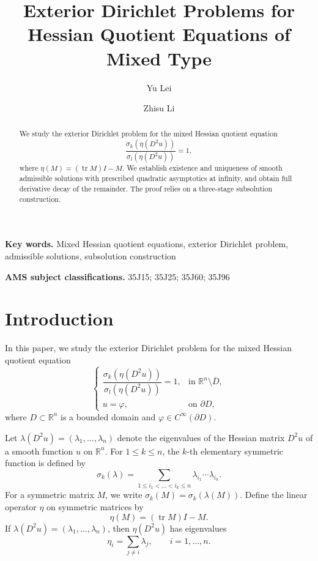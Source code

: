 \documentclass[reqno,a4paper]{amsart}
\numberwithin{equation}{section}
\begin{document}
	
	\title{Exterior Dirichlet Problems for Hessian Quotient Equations of Mixed Type}
	
	\author{Yu Lei}
	\address{School of Mathematics and Center for Nonlinear Studies, Northwest University, Xi'an, 710127, PR China}
	
	\author{Zhisu Li}
	\address{School of Mathematics and Center for Nonlinear Studies, Northwest University, Xi'an, 710127, PR China}
	
	\maketitle
	
	\begin{abstract}
		We study the exterior Dirichlet problem for the mixed Hessian quotient equation
		\[
		\frac{\sigma_k(\eta(D^2 u))}{\sigma_l(\eta(D^2 u))} = 1, 
		\]
		where $\eta(M) = (\operatorname{tr} M)I - M$. 
		We establish existence and uniqueness of smooth admissible solutions with prescribed quadratic asymptotics at infinity, 
		and obtain full derivative decay of the remainder. 
		The proof relies on a three-stage subsolution construction.
	\end{abstract}
	
	\textbf{Key words.}
	Mixed Hessian quotient equations, exterior Dirichlet problem, admissible solutions, subsolution construction
	
	\textbf{AMS subject classifications.}
	35J15; 35J25; 35J60; 35J96
	
	\section{Introduction}
	In this paper, we study the exterior Dirichlet problem for the mixed Hessian quotient equation
	\begin{equation}
		\begin{cases}
			\dfrac{\sigma_k(\eta(D^2 u))}{\sigma_l(\eta(D^2 u))} = 1, & \text{in } \mathbb{R}^n \setminus \overline{D}, \\[6pt]
			u = \varphi, & \text{on } \partial D,
		\end{cases}
		\label{eq:main}
	\end{equation}
	where $D \subset \mathbb{R}^n$ is a bounded domain and $\varphi \in C^\infty(\partial D)$.
	
	Let $\lambda(D^2 u) = (\lambda_1, \dots, \lambda_n)$ denote the eigenvalues of the Hessian matrix $D^2 u$ of a smooth function $u$ on $\mathbb{R}^n$. 
	For $1 \le k \le n$, the $k$-th elementary symmetric function is defined by
	\[
	\sigma_k(\lambda) = \sum_{1 \le i_1 < \dots < i_k \le n} \lambda_{i_1} \cdots \lambda_{i_k}.
	\]
	For a symmetric matrix $M$, we write $\sigma_k(M) = \sigma_k(\lambda(M))$.
	Define the linear operator $\eta$ on symmetric matrices by
	\[
	\eta(M) = (\operatorname{tr} M) I - M.
	\]
	If $\lambda(D^2 u) = (\lambda_1, \dots, \lambda_n)$, then $\eta(D^2 u)$ has eigenvalues
	\[
	\eta_i = \sum_{j \neq i} \lambda_j, \qquad i = 1, \dots, n.
	\]
	
\end{document}
